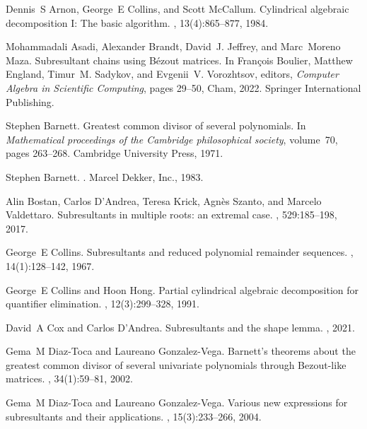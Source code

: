 \documentclass{article}
\begin{document}
\begin{thebibliography}{10}
Dennis~S Arnon, George~E Collins, and Scott McCallum.
\newblock Cylindrical algebraic decomposition I: The basic algorithm.
, 13(4):865--877, 1984.

Mohammadali Asadi, Alexander Brandt, David~J. Jeffrey, and Marc~Moreno Maza.
\newblock Subresultant chains using B{\'e}zout matrices.
\newblock In Fran{\c{c}}ois Boulier, Matthew England, Timur~M. Sadykov, and
  Evgenii~V. Vorozhtsov, editors, {\em Computer Algebra in Scientific
  Computing}, pages 29--50, Cham, 2022. Springer International Publishing.

Stephen Barnett.
\newblock Greatest common divisor of several polynomials.
\newblock In {\em Mathematical proceedings of the Cambridge philosophical
  society}, volume~70, pages 263--268. Cambridge University Press, 1971.

Stephen Barnett.
.
\newblock Marcel Dekker, Inc., 1983.

Alin Bostan, Carlos D'Andrea, Teresa Krick, Agn{\`e}s Szanto, and Marcelo
  Valdettaro.
\newblock Subresultants in multiple roots: an extremal case.
, 529:185--198, 2017.

George~E Collins.
\newblock Subresultants and reduced polynomial remainder sequences.
, 14(1):128--142, 1967.

George~E Collins and Hoon Hong.
\newblock Partial cylindrical algebraic decomposition for quantifier
  elimination.
, 12(3):299--328, 1991.

David~A Cox and Carlos D'Andrea.
\newblock Subresultants and the shape lemma.
, 2021.

Gema~M Diaz-Toca and Laureano Gonzalez-Vega.
\newblock Barnett's theorems about the greatest common divisor of several
  univariate polynomials through Bezout-like matrices.
, 34(1):59--81, 2002.

Gema~M Diaz-Toca and Laureano Gonzalez-Vega.
\newblock Various new expressions for subresultants and their applications.
,
  15(3):233--266, 2004.


\end{thebibliography}
\end{document}
